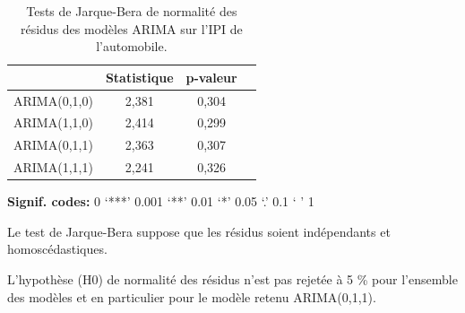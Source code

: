 \documentclass[french]{article}
\begin{document}
\begin{table}[!h]

\caption{\label{tab:tabjb}Tests de Jarque-Bera de normalité des résidus des modèles ARIMA sur l'IPI de l'automobile.}
\centering
\begin{threeparttable}
\begin{tabular}[t]{lccc}
\toprule
  & Statistique & p-valeur & \\
\midrule
ARIMA(0,1,0) & 2,381 & 0,304 & \\
ARIMA(1,1,0) & 2,414 & 0,299 & \\
ARIMA(0,1,1) & 2,363 & 0,307 & \\
ARIMA(1,1,1) & 2,241 & 0,326 & \\
\bottomrule
\end{tabular}
\begin{tablenotes}
\item \hspace{-0.4cm}\textbf{Signif. codes: }0 `***' 0.001 `**' 0.01 `*' 0.05 `.' 0.1 ` ' 1
\item Le test de Jarque-Bera suppose que les résidus soient indépendants et homoscédastiques.
\item L’hypothèse (H0) de normalité des résidus n’est pas rejetée à 5 \% pour l’ensemble des modèles et en particulier pour le modèle retenu ARIMA(0,1,1).
\end{tablenotes}
\end{threeparttable}
\end{table}
\end{document}
